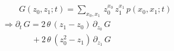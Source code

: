 \documentclass[10pt]{article}
\begin{document}
\begin{align*}
&\qquad G(z_0, z_1; t) = \sum_{x_0, x_1}\, z_0^{x_0}\, z_1^{x_1}\, p(x_0, x_1; t)\\
&\Rightarrow \partial_t \,G = 2\,\theta\,(z_1 - z_0)\, \partial_{z_0} \,G \\
&\quad\quad\quad\,\,\, + 2\,\theta\,(z_0^2 - z_1)\, \partial_{z_1} \,G\end{align*}
\end{document}
